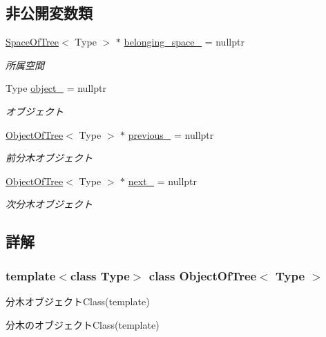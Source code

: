 \subsection*{非公開変数類}
\begin{DoxyCompactItemize}
\item 
\mbox{\hyperlink{class_space_of_tree}{Space\+Of\+Tree}}$<$ Type $>$ $\ast$ \mbox{\hyperlink{class_object_of_tree_a4f0673854adc10539b4b99558ea3b696}{belonging\+\_\+space\+\_\+}} = nullptr
\begin{DoxyCompactList}\small\item\em 所属空間 \end{DoxyCompactList}\item 
Type \mbox{\hyperlink{class_object_of_tree_ad3ce36879f78ba2c2171385a8428c7ba}{object\+\_\+}} = nullptr
\begin{DoxyCompactList}\small\item\em オブジェクト \end{DoxyCompactList}\item 
\mbox{\hyperlink{class_object_of_tree}{Object\+Of\+Tree}}$<$ Type $>$ $\ast$ \mbox{\hyperlink{class_object_of_tree_ac219b6d840381214e54bb248ac1c2693}{previous\+\_\+}} = nullptr
\begin{DoxyCompactList}\small\item\em 前分木オブジェクト \end{DoxyCompactList}\item 
\mbox{\hyperlink{class_object_of_tree}{Object\+Of\+Tree}}$<$ Type $>$ $\ast$ \mbox{\hyperlink{class_object_of_tree_af76d6e92ce202ad91b48896a6a5af95f}{next\+\_\+}} = nullptr
\begin{DoxyCompactList}\small\item\em 次分木オブジェクト \end{DoxyCompactList}\end{DoxyCompactItemize}


\subsection{詳解}
\subsubsection*{template$<$class Type$>$\newline
class Object\+Of\+Tree$<$ Type $>$}

分木オブジェクト\+Class(template) 

分木のオブジェクト\+Class(template) 

